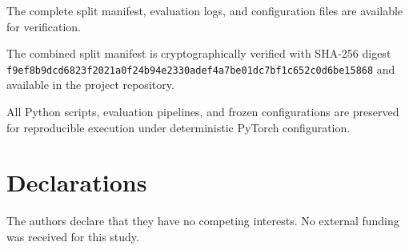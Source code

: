 \documentclass[pdflatex,sn-mathphys-num]{sn-jnl}
\theoremstyle{thmstyleone}%
\theoremstyle{thmstyletwo}%
\theoremstyle{thmstylethree}%
\begin{document}
The complete split manifest, evaluation logs, and configuration files are available for verification.

The combined split manifest is cryptographically verified with SHA-256 digest \texttt{f9ef8b9dcd6823f2021a0f24b94e2330adef4a7be01dc7bf1c652c0d6be15868} and available in the project repository.

All Python scripts, evaluation pipelines, and frozen configurations are preserved for reproducible execution under deterministic PyTorch configuration.

\section*{Declarations}
The authors declare that they have no competing interests. No external funding was received for this study.

\end{document}
